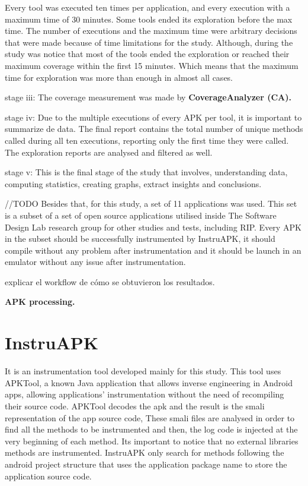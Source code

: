 Every tool was executed ten times per application, and every execution with a maximum time of 30 minutes. Some tools ended its exploration before the max time. 
The number of executions and the maximum time were arbitrary decisions that were made because of time limitations for the study. Although, during the study was notice that most of the tools ended the exploration or reached their maximum coverage within the first 15 minutes. Which means that the maximum time for exploration was more than enough in almost all cases. 
 
stage iii: The coverage measurement was made by \textbf{CoverageAnalyzer (CA).}


stage iv: Due to the multiple executions of every APK per tool, it is important to summarize de data. The final report contains the total number of unique methods called during all ten executions, reporting only the first time they were called.
The exploration reports are analysed and filtered as well.

stage v: This is the final stage of the study that involves, understanding data, computing statistics, creating graphs, extract insights and conclusions. 


//TODO
Besides that, for this study, a set of 11 applications was used. This set is a subset of a set of open source applications utilised inside The Software Design Lab research group for other studies and tests, including RIP. Every APK in the subset should be successfully instrumented by InstruAPK, it should compile without any problem after instrumentation and it should be launch in an emulator without any issue after instrumentation.


explicar el workflow de cómo se obtuvieron los resultados.

\textbf{APK processing.} 

\section{InstruAPK}

It is an instrumentation tool developed mainly for this study. This tool uses APKTool, a known Java application that allows inverse engineering in Android apps, allowing applications' instrumentation without the need of recompiling their source code. APKTool decodes the apk and the result is the smali representation of the app source code, These smali files are analysed in order to find all the methods to be instrumented and then, the log code is injected at the very beginning of each method. Its important to notice that no external libraries methods are instrumented. InstruAPK only search for methods following the android project structure that uses the application package name to store the application source code.

